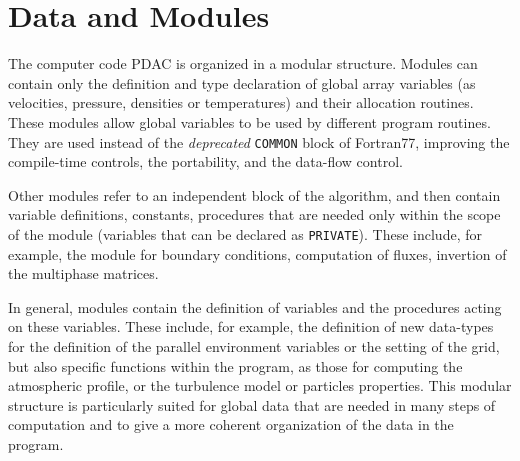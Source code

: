 \section{Data and Modules}
The computer code PDAC is organized in a modular structure.
Modules can contain only the definition and type declaration
of global array variables (as velocities, pressure, densities or
temperatures) and their allocation routines. These modules allow
global variables to be used by different program routines. They are
used instead of the {\em deprecated} {\tt COMMON} block of Fortran77, improving
the compile-time controls, the portability, and the data-flow control.

Other modules refer to an independent block of the algorithm, and then contain
variable definitions, constants, procedures that are needed only
within the scope of the module (variables that can be declared as {\tt PRIVATE}). 
These include, for example, the module for boundary conditions, computation 
of fluxes, invertion of the multiphase matrices.

In general, modules contain the definition of variables 
and the procedures acting on these variables. These include,
for example, the definition of new data-types for the definition of 
the parallel environment variables or the setting of the grid, but also
specific functions within the program, as those for computing the atmospheric 
profile, or the turbulence model or particles properties. 
 This modular structure is particularly suited for global
data that are needed in many steps of computation and to give a more 
coherent organization of the data in the program.

